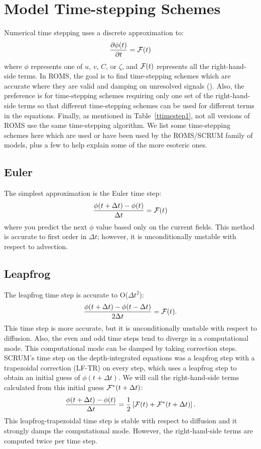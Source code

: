 \section {Model Time-stepping Schemes}
\label{Frog}
Numerical time stepping uses a discrete approximation to:
\begin{equation}
  \frac{\partial \phi(t)}{\partial t} = {\cal F}(t)
  \label{eq_rhs1}
\end{equation}
where $\phi$ represents one of $u$, $v$, $C$, or $\zeta$,
and ${\cal F}(t)$
represents all the right-hand-side terms.
In ROMS, the goal is to find time-stepping schemes which are accurate
where they are valid and damping on unresolved signals
(\cite{SS2008b}). Also, the preference is for time-stepping schemes
requiring only one set of the right-hand-side terms so that different
time-stepping schemes can be used for different terms in the equations.
Finally, as mentioned in Table~\ref{ttimestep1}, not all versions of
ROMS use the same time-stepping algorithm. We list some
time-stepping schemes here which are used or have been used by the
ROMS/SCRUM family of models, plus a few to help explain some of the
more esoteric ones.

\subsection{Euler}
The simplest approximation is the Euler time step:
\begin{equation}
  \frac{\phi(t + \Delta t) - \phi(t)}{\Delta t} = {\cal F}(t)
\end{equation}
where you predict the next $\phi$ value based only on the current
fields.  This method is accurate to first order in $\Delta t$; however,
it is unconditionally unstable with respect to advection.

\subsection{Leapfrog}
The leapfrog time step is accurate to O($\Delta t^2$):
\begin{equation}
  \frac{\phi(t + \Delta t) - \phi(t - \Delta t)}{2\Delta t} =
  {\cal F}(t).
\end{equation}
This time step is more accurate, but it is unconditionally unstable
with respect to diffusion.  Also,
the even and odd time steps tend to diverge in a computational mode.
This computational mode can be damped by taking
correction steps.  SCRUM's time step on the depth-integrated
equations was a leapfrog step with a trapezoidal correction (LF-TR)
on every step, which uses a leapfrog step to obtain an initial guess of
$\phi(t+\Delta t)$.  We will call the right-hand-side terms calculated
from this initial guess ${\cal F}^*(t+\Delta t)$:
\begin{equation}
  \frac{\phi(t + \Delta t) - \phi(t)}{\Delta t} = \frac{1}{2}
  \left[ {\cal F}(t) + {\cal F}^*(t+\Delta t) \right] .
\end{equation}
This leapfrog-trapezoidal time step is stable with respect to diffusion
and it strongly damps the computational mode.  However, the
right-hand-side terms are computed twice per time step.

